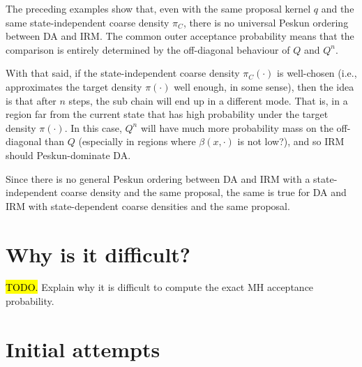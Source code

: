 \documentclass[12pt]{article}
\theoremstyle{definition}
\theoremstyle{remark}
\theoremstyle{plain}
\begin{document}
The preceding examples show that, even with the same proposal kernel
$q$ and the same state-independent coarse density $\pi_C$, there is no
universal Peskun ordering between DA and IRM.
The common outer acceptance probability means that the comparison is
entirely determined by the off-diagonal behaviour of $Q$ and $Q^n$.

With that said, if the state-independent coarse density $\pi_C(\cdot)$ 
is well-chosen (i.e., approximates the target density $\pi(\cdot)$ well enough, in some sense), 
then the idea is that after $n$ steps, the sub chain will end up in a different mode.
That is, in a region far from the current state that has high probability under 
the target density $\pi(\cdot)$. 
In this case, $Q^n$ will have much more probability mass on the off-diagonal than $Q$ 
(especially in regions where $\beta(x, \cdot)$ is not low?), and so 
IRM should Peskun-dominate DA.

Since there is no general Peskun ordering between DA and IRM with a state-independent coarse density and the same proposal, 
the same is true for DA and IRM with state-dependent coarse densities and the same proposal. 


\section{Why is it difficult?}
\hl{TODO.}
Explain why it is difficult to compute the exact MH acceptance probability. 


\section{Initial attempts}
\end{document}
